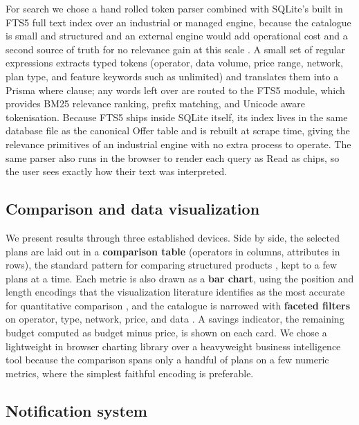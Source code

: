 For search we chose a hand rolled token parser combined with SQLite's built in FTS5 full text index over an industrial or managed engine, because the catalogue is small and structured and an external engine would add operational cost and a second source of truth for no relevance gain at this scale \parencite{Vandic2024Faceted, MeilisearchComparison2025, SQLiteFTS5}. A small set of regular expressions extracts typed tokens (operator, data volume, price range, network, plan type, and feature keywords such as \guillemotleft{}unlimited\guillemotright{}) and translates them into a Prisma where clause; any words left over are routed to the FTS5 module, which provides BM25 relevance ranking, prefix matching, and Unicode aware tokenisation. Because FTS5 ships inside SQLite itself, its index lives in the same database file as the canonical Offer table and is rebuilt at scrape time, giving the relevance primitives of an industrial engine with no extra process to operate. The same parser also runs in the browser to render each query as \guillemotleft{}Read as\guillemotright{} chips, so the user sees exactly how their text was interpreted.

\subsection{Comparison and data visualization}

We present results through three established devices. Side by side, the selected plans are laid out in a \textbf{comparison table} (operators in columns, attributes in rows), the standard pattern for comparing structured products \parencite{NielsenComparisonTables}, kept to a few plans at a time. Each metric is also drawn as a \textbf{bar chart}, using the position and length encodings that the visualization literature identifies as the most accurate for quantitative comparison \parencite{Munzner2014, Gratzl2013LineUp}, and the catalogue is narrowed with \textbf{faceted filters} on operator, type, network, price, and data \parencite{Vandic2024Faceted}. A savings indicator, the remaining budget computed as budget minus price, is shown on each card. We chose a lightweight in browser charting library over a heavyweight business intelligence tool because the comparison spans only a handful of plans on a few numeric metrics, where the simplest faithful encoding is preferable.

\subsection{Notification system}

